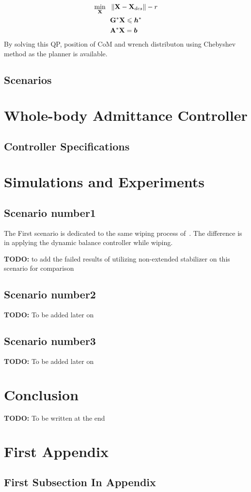 \documentclass[letterpaper, 10pt, conference]{ieeeconf}
\newcommand{\TODO}[1]{{\color{red} {\bf TODO:} {#1}}}
\begin{document}
\begin{subequations}
	\begin{align}
	\min_{\mathbf{X}} \ \ &\left\lVert\mathbf{X}-\mathbf{X}_{des}\right\rVert-r \\
	 &\mathbf{G}^* \mathbf{X} \leqslant \bm{h}^* \\
	 &\mathbf{A}^* \mathbf{X} = \bm{b}
	\end{align}
\end{subequations}
By solving this QP, position of CoM and wrench distributon using Chebyshev method as the planner is available.

\subsection{Scenarios}

\section{Whole-body Admittance Controller} \label{Sec_WBQP}

\subsection{Controller Specifications}


\section{Simulations and Experiments} \label{Sec_Simulations_and_Experiments}

\subsection{Scenario number1}
The First scenario is dedicated to the same wiping process of~\cite{Samadi2019HAL}. The difference is in applying the dynamic balance controller while wiping.

\TODO{to add the failed results of utilizing non-extended stabilizer on this scenario for comparison}
\subsection{Scenario number2}
\TODO{To be added later on}
\subsection{Scenario number3}
\TODO{To be added later on}

\section{Conclusion} \label{Sec_Conclusion}
\TODO{To be written at the end}




\appendices
\section{First Appendix} \label{FirstAppendix}
 \subsection{First Subsection In Appendix}
\end{document}
